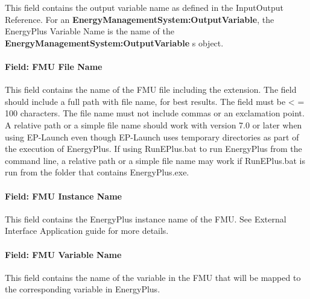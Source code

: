 This field contains the output variable name as defined in the InputOutput Reference. For an \textbf{EnergyManagementSystem:OutputVariable}, the EnergyPlus Variable Name is the name of the \textbf{EnergyManagementSystem:OutputVariable} s object.

\paragraph{Field: FMU File Name}\label{field-fmu-file-name-1}

This field contains the name of the FMU file including the extension. The field should include a full path with file name, for best results. The field must be \textless{} = 100 characters. The file name must not include commas or an exclamation point. A relative path or a simple file name should work with version 7.0 or later when using EP-Launch even though EP-Launch uses temporary directories as part of the execution of EnergyPlus. If using RunEPlus.bat to run EnergyPlus from the command line, a relative path or a simple file name may work if RunEPlus.bat is run from the folder that contains EnergyPlus.exe.

\paragraph{Field: FMU Instance Name}\label{field-fmu-instance-name}

This field contains the EnergyPlus instance name of the FMU. See External Interface Application guide for more details.

\paragraph{Field: FMU Variable Name}\label{field-fmu-variable-name}

This field contains the name of the variable in the FMU that will be mapped to the corresponding variable in EnergyPlus.

